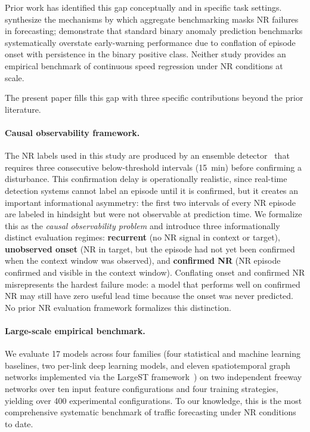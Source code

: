 \documentclass[a4paper]{cas-sc}
\begin{document}
Prior work has identified this gap conceptually and in specific task
settings.
\citet{bae2026why} synthesize the mechanisms by which aggregate
benchmarking masks NR failures in forecasting; \citet{bae2026onset}
demonstrate that standard binary anomaly prediction benchmarks
systematically overstate early-warning performance due to conflation
of episode onset with persistence in the binary positive class.
Neither study provides an empirical benchmark of continuous speed
regression under NR conditions at scale.

The present paper fills this gap with three specific contributions
beyond the prior literature.

\paragraph{Causal observability framework.}
The NR labels used in this study are produced by an ensemble
detector~\citep{bae2026labeling} that requires three consecutive
below-threshold intervals (15~min) before confirming a disturbance.
This confirmation delay is operationally realistic, since real-time
detection systems cannot label an episode until it is confirmed, but
it creates an important informational asymmetry: the first two
intervals of every NR episode are labeled in hindsight but were
not observable at prediction time.
We formalize this as the \emph{causal observability problem} and
introduce three informationally distinct evaluation regimes:
\textbf{recurrent} (no NR signal in context or target),
\textbf{unobserved onset} (NR in target, but the episode had not
yet been confirmed when the context window was observed), and
\textbf{confirmed NR} (NR episode confirmed and visible in the
context window).
Conflating onset and confirmed NR misrepresents the hardest failure
mode: a model that performs well on confirmed NR may still have
zero useful lead time because the onset was never predicted.
No prior NR evaluation framework formalizes this distinction.

\paragraph{Large-scale empirical benchmark.}
We evaluate 17 models across four families (four statistical and
machine learning baselines, two per-link deep learning models, and
eleven spatiotemporal graph networks implemented via the LargeST
framework~\citep{liu2024largest}) on two independent freeway
networks over ten input feature configurations and four training
strategies, yielding over 400 experimental configurations.
To our knowledge, this is the most comprehensive systematic
benchmark of traffic forecasting under NR conditions to date.
\end{document}
